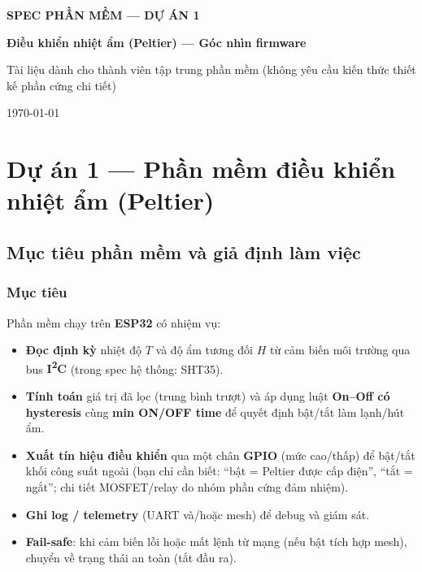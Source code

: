 \documentclass[12pt,a4paper]{report}
\begin{document}
\begin{titlepage}
\centering
\vspace*{2cm}

{\Large \textbf{SPEC PHẦN MỀM --- DỰ ÁN 1}\par}
\vspace{0.5cm}
{\LARGE \textbf{Điều khiển nhiệt ẩm (Peltier) --- Góc nhìn firmware}\par}

\vspace{1.5cm}
{\large Tài liệu dành cho thành viên tập trung phần mềm (không yêu cầu kiến thức thiết kế phần cứng chi tiết)\par}

\vfill
{\large \today\par}
\end{titlepage}

\tableofcontents
\clearpage

\chapter{Dự án 1 --- Phần mềm điều khiển nhiệt ẩm (Peltier)}

\section{Mục tiêu phần mềm và giả định làm việc}

\subsection{Mục tiêu}
Phần mềm chạy trên \textbf{ESP32} có nhiệm vụ:
\begin{itemize}
  \item \textbf{Đọc định kỳ} nhiệt độ $T$ và độ ẩm tương đối $H$ từ cảm biến môi trường qua bus \textbf{I\textsuperscript{2}C} (trong spec hệ thống: SHT35).
  \item \textbf{Tính toán} giá trị đã lọc (trung bình trượt) và áp dụng luật \textbf{On--Off có hysteresis} cùng \textbf{min ON/OFF time} để quyết định bật/tắt làm lạnh/hút ẩm.
  \item \textbf{Xuất tín hiệu điều khiển} qua một chân \textbf{GPIO} (mức cao/thấp) để bật/tắt khối công suất ngoài (bạn chỉ cần biết: ``bật = Peltier được cấp điện'', ``tắt = ngắt''; chi tiết MOSFET/relay do nhóm phần cứng đảm nhiệm).
  \item \textbf{Ghi log / telemetry} (UART và/hoặc mesh) để debug và giám sát.
  \item \textbf{Fail-safe}: khi cảm biến lỗi hoặc mất lệnh từ mạng (nếu bật tích hợp mesh), chuyển về trạng thái an toàn (tắt đầu ra).
\end{itemize}
\end{document}

